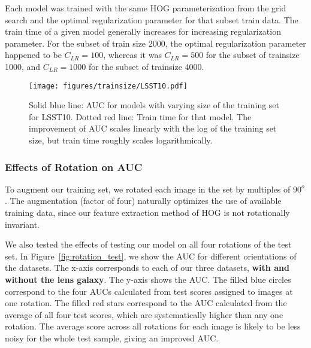 \documentclass{emulateapj}
\newcommand{\todo}[1]{{\bf\color{blue} #1}}
\begin{document}
Each model was trained with the same HOG parameterization from the
grid search and the optimal regularization parameter for that subset
train data.  The train time of a given model generally increases for
increasing regularization parameter.  For the subset of train size
2000, the optimal regularization parameter happened to be
$C_{LR}=100$, whereas it was $C_{LR}=500$ for the subset of trainsize
1000, and $C_{LR}=1000$ for the subset of trainsize 4000.

\begin{figure}[t]\label{fig:trainsize}
\begin{center}
\texttt{[image: figures/trainsize/LSST10.pdf]}
\caption{Solid blue line: AUC for models with varying size of the
  training set for LSST10.  Dotted red line: Train time for that
  model.  The improvement of AUC scales linearly with the log of the
  training set size, but train time roughly scales logarithmically.}
\end{center}
\end{figure}


\subsubsection{Effects of Rotation on AUC}
To augment our training set, we rotated each image in the set by
multiples of $90^o$.  The augmentation (factor of four) naturally
optimizes the use of available training data, since our feature
extraction method of HOG is not rotationally invariant.  

We also tested the effects of testing our model on all four rotations
of the test set.  In Figure~\ref{fig:rotation_test}, we show the AUC
for different orientations of the datasets.  The x-axis corresponds to
each of our three datasets, \todo{with and without the lens galaxy}.
The y-axis shows the AUC.  The filled blue circles correspond to the
four AUCs calculated from test scores assigned to images at one
rotation.  The filled red stars correspond to the AUC calculated from
the average of all four test scores, which are systematically higher
than any one rotation.  The average score across all rotations for
each image is likely to be less noisy for the whole test sample,
giving an improved AUC.
\end{document}
